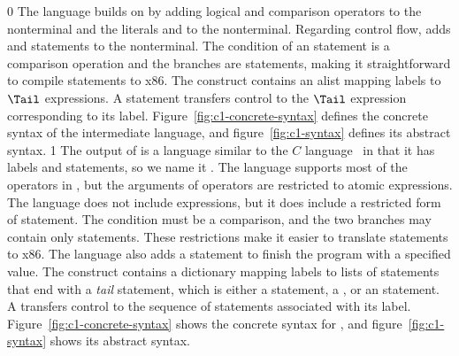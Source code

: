 \documentclass[7x10]{TimesAPriori_MIT}%
\def\racketEd{0}
\def\pythonEd{1}
\providecommand{\BookEdition}{1}
\let\edition\BookEdition
\newcommand{\pythonColor}[0]{}
\numberwithin{theorem}{chapter}
\numberwithin{definition}{chapter}
\numberwithin{equation}{chapter}
\begin{document}
{\if\edition\racketEd
%
The \LangCIf{} language builds on \LangCVar{} by adding logical and
comparison operators to the \Exp{} nonterminal and the literals
\TRUE{} and \FALSE{} to the \Atm{} nonterminal.  Regarding control
flow, \LangCIf{} adds  and  statements to the
\Tail{} nonterminal. The condition of an  statement is a
comparison operation and the branches are  statements,
making it straightforward to compile  statements to x86.  The
 construct contains an alist mapping labels to $\Tail$
expressions. A  statement transfers control to the $\Tail$
expression corresponding to its label.
%
Figure~\ref{fig:c1-concrete-syntax} defines the concrete syntax of the
\LangCIf{} intermediate language, and figure~\ref{fig:c1-syntax}
defines its abstract syntax.
%
\fi}
%
{\if\edition\pythonEd\pythonColor
%
The output of  is a language similar to the
$C$ language~\citep{Kernighan:1988nx} in that it has labels and
 statements, so we name it \LangCIf{}.  
%
The \LangCIf{} language supports most of the operators in \LangIf{}, but
the arguments of operators are restricted to atomic expressions. The
\LangCIf{} language does not include  expressions, but it does
include a restricted form of  statement. The condition must be
a comparison, and the two branches may contain only 
statements. These restrictions make it easier to translate 
statements to x86.  The \LangCIf{} language also adds a 
statement to finish the program with a specified value.
%
The  construct contains a dictionary mapping labels to
lists of statements that end with a \emph{tail} statement, which is
either a  statement, a , or an
 statement.
%
A  transfers control to the sequence of statements
associated with its label.
%
Figure~\ref{fig:c1-concrete-syntax} shows the concrete syntax for \LangCIf{},
and figure~\ref{fig:c1-syntax} shows its
abstract syntax.
%
\fi}
%

\newcommand{\CifGrammarRacket}{
\begin{array}{lcl}
\Atm &::=& \itm{bool} \\
\itm{cmp} &::= & \code{eq?} \MID \code{<} \MID \code{<=} \MID \code{>} \MID \code{>=} \\
\Exp &::=& \CNOT{\Atm} \MID \LP \itm{cmp}~\Atm~\Atm\RP \\
\Tail &::= & \key{goto}~\itm{label}\key{;}\\
   &\MID& \key{if}~\LP \itm{cmp}~\Atm~\Atm \RP~ \key{goto}~\itm{label}\key{;} ~\key{else}~\key{goto}~\itm{label}\key{;} 
\end{array}
}
\end{document}
